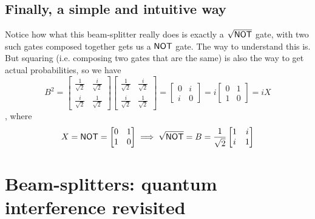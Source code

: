 \documentclass[12pt]{article}
\begin{document}
\subsection{Finally, a simple and intuitive way}
Notice how what this beam-splitter really does is exactly a $\sqrt{{\textsf{NOT}}}$ gate, with two such gates composed together gets us a ${\textsf{NOT}}$ gate. The way to understand this is. But squaring (i.e. composing two gates that are the same) is also the way to get actual probabilities, so we have $$
B^2 = \begin{bmatrix}
\frac{1}{\sqrt{2}} & \frac{i}{\sqrt{2}}\\
\frac{i}{\sqrt{2}} & \frac{1}{\sqrt{2}}
\end{bmatrix}\begin{bmatrix}
\frac{1}{\sqrt{2}} & \frac{i}{\sqrt{2}}\\
\frac{i}{\sqrt{2}} & \frac{1}{\sqrt{2}}
\end{bmatrix} = \begin{bmatrix}
0 & i\\
i & 0
\end{bmatrix} = i \begin{bmatrix}
0 & 1\\
1 & 0
\end{bmatrix} = iX
$$, where $$
X = {\textsf{NOT}} = \begin{bmatrix}
0 & 1\\
1 & 0
\end{bmatrix} \implies \sqrt{{\textsf{NOT}}} = B = \frac{1}{\sqrt{2}} \begin{bmatrix}
1 & i\\
i & 1
\end{bmatrix}
$$

\section{Beam-splitters: quantum interference revisited}
\end{document}
